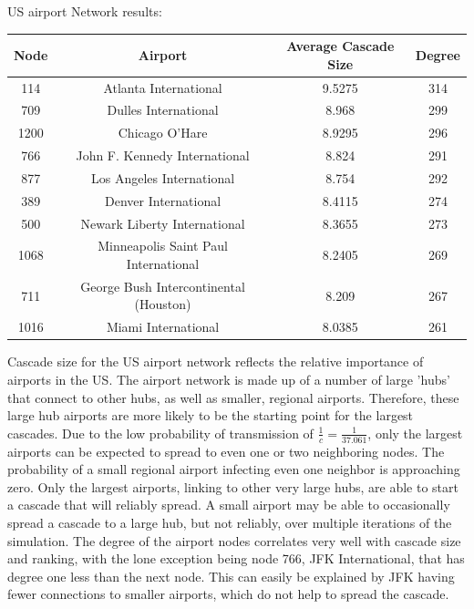 \documentclass[11pt, oneside]{article}   	%
\begin{document}
\begin{center} US airport Network results:\\
\begin{tabular}{c|c|c|c}
\hline
Node & Airport & Average Cascade Size&Degree\\
\hline
114& Atlanta International & 9.5275& 314\\
\hline
709& Dulles International & 8.968&299\\
\hline
1200&Chicago O'Hare & 8.9295&296\\
\hline
766&John F. Kennedy International & 8.824&291\\
\hline
877&Los Angeles International & 8.754&292\\
\hline
389&Denver International & 8.4115&274\\
\hline
500&Newark Liberty International & 8.3655&273\\
\hline
1068& Minneapolis Saint Paul International & 8.2405&269\\
\hline
711&George Bush Intercontinental (Houston) & 8.209&267\\
\hline
1016& Miami International& 8.0385&261\\
\hline
\end{tabular}
\end{center}
\indent\indent Cascade size for the US airport network reflects the relative importance of airports in the US.  The airport network is made up of a number of large 'hubs' that connect to other hubs, as well as smaller, regional airports.  Therefore, these large hub airports are more likely to be the starting point for the largest cascades.  Due to the low probability of transmission of $\frac{1}{c}=\frac{1}{37.061}$, only the largest airports can be expected to spread to even one or two neighboring nodes.  The probability of a small regional airport infecting even one neighbor is approaching zero.  Only the largest airports, linking to other very large hubs, are able to start a cascade that will reliably spread.  A small airport may be able to occasionally spread a cascade to a large hub, but not reliably, over multiple iterations of the simulation.  The degree of the airport nodes correlates very well with cascade size and ranking, with the lone exception being node 766, JFK International, that has degree one less than the next node.  This can easily be explained by JFK having fewer connections to smaller airports, which do not help to spread the cascade.\\\\\\\\\\\\\\\\\\\\\\\\
\end{document}
